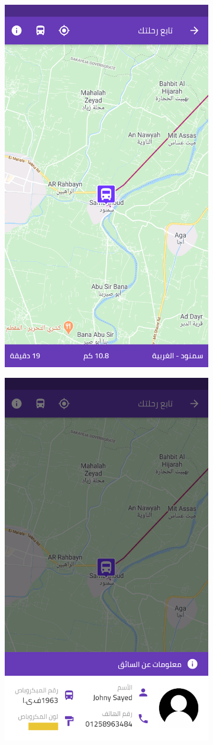 \begin{figure}[H]
\begin{subfigure}[b]{0.5\linewidth}
    \label{fig7:c} 
  \end{subfigure}%
  \begin{subfigure}[b]{0.5\linewidth}
    \centering
    \includegraphics[width=0.5\linewidth]{images/ch3/10.png} 
    \label{fig7:d} 
  \end{subfigure} 
  \begin{subfigure}[b]{0.5\linewidth}
    \centering
    \includegraphics[width=0.5\linewidth]{images/ch3/11.png}
  

\end{subfigure}
\end{figure}
